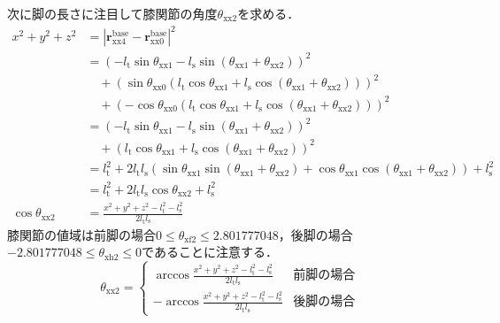 \documentclass[a4paper]{jlreq}
\begin{document}
  次に脚の長さに注目して膝関節の角度$\theta_\mathrm{xx2}$を求める．
  \begin{align*}
    x^2 + y^2 + z^2 &= \left|\boldsymbol{r}_\mathrm{xx4}^\mathrm{base} - \boldsymbol{r}^\mathrm{base}_\mathrm{xx0}\right|^2 \\
    &= \left(-l_\mathrm{t}\sin{\theta_\mathrm{xx1}} - l_\mathrm{s}\sin{\left(\theta_\mathrm{xx1}+\theta_\mathrm{xx2}\right)}\right)^2 \\
    &\quad + \left(\sin\theta_\mathrm{xx0}\left(l_\mathrm{t}\cos{\theta_\mathrm{xx1}} + l_\mathrm{s}\cos{\left(\theta_\mathrm{xx1}+\theta_\mathrm{xx2}\right)}\right)\right)^2 \\
    &\quad + \left(-\cos\theta_\mathrm{xx0}\left(l_\mathrm{t}\cos{\theta_\mathrm{xx1}} + l_\mathrm{s}\cos{\left(\theta_\mathrm{xx1}+\theta_\mathrm{xx2}\right)}\right)\right)^2 \\
    &= \left(-l_\mathrm{t}\sin{\theta_\mathrm{xx1}} - l_\mathrm{s}\sin{\left(\theta_\mathrm{xx1}+\theta_\mathrm{xx2}\right)}\right)^2 \\
    &\quad + \left(l_\mathrm{t}\cos{\theta_\mathrm{xx1}} + l_\mathrm{s}\cos{\left(\theta_\mathrm{xx1}+\theta_\mathrm{xx2}\right)}\right)^2 \\
    &= l_\mathrm{t}^2 + 2l_\mathrm{t}l_\mathrm{s}\left(
      \sin{\theta_\mathrm{xx1}}\sin{\left(\theta_\mathrm{xx1}+\theta_\mathrm{xx2}\right)}
      + \cos{\theta_\mathrm{xx1}}\cos{\left(\theta_\mathrm{xx1}+\theta_\mathrm{xx2}\right)}\right)
     + l_\mathrm{s}^2 \\
    &= l_\mathrm{t}^2 + 2l_\mathrm{t}l_\mathrm{s}\cos{\theta_\mathrm{xx2}} + l_\mathrm{s}^2 \\
    \cos{\theta_\mathrm{xx2}} &= \frac{x^2 + y^2 + z^2 - l_\mathrm{t}^2 - l_\mathrm{s}^2}{2l_\mathrm{t}l_\mathrm{s}}
  \end{align*}
  膝関節の値域は前脚の場合$0 \leq \theta_\mathrm{xf2} \leq 2.801777048$，後脚の場合$-2.801777048 \leq \theta_\mathrm{xh2} \leq 0$であることに注意する．
  \[
    \theta_\mathrm{xx2} = \begin{cases}
      \arccos{\frac{x^2 + y^2 + z^2 - l_\mathrm{t}^2 - l_\mathrm{s}^2}{2l_\mathrm{t}l_\mathrm{s}}} & \text{前脚の場合} \\
      -\arccos{\frac{x^2 + y^2 + z^2 - l_\mathrm{t}^2 - l_\mathrm{s}^2}{2l_\mathrm{t}l_\mathrm{s}}} & \text{後脚の場合}
    \end{cases}
  \]
\end{document}
